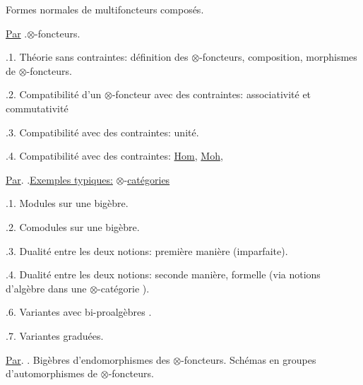   Formes normales de multifoncteurs composés. 

\uline{Par} .\qquad $\otimes$-foncteurs.

.1. Théorie sans contraintes: définition des $\otimes$-foncteurs, composition, morphismes de $\otimes$-foncteurs.

.2. Compatibilité d'un $\otimes$-foncteur avec des contraintes: associativité et commutativité\handwritten{!}

.3. Compatibilité avec des contraintes: unité.

.4. Compatibilité avec des contraintes: \uline{Hom}, \uline{Moh}, 


\uline{Par}. .\qquad \uline{Exemples typiques:} $\otimes$-\uline{catégories}


.1. Modules sur une bigèbre.

.2. Comodules sur une bigèbre.

.3. Dualité entre les deux notions: première manière (imparfaite).

.4. Dualité entre les deux notions: seconde manière, formelle (via  notions d'algèbre dans une $\otimes$-catégorie ).



.6. Variantes avec bi-proalgèbres .

.7. Variantes graduées.

\uline{Par}. . Bigèbres d'endomorphismes des $\otimes$-foncteurs. Schémas en groupes d'automorphismes de $\otimes$-foncteurs.

